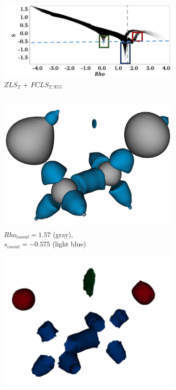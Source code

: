 \begin{figure}[t]
\begin{subfigure}{\linewidth}
\centering
\includegraphics[width=0.8\linewidth]{Images/EthaneDiol/scatterplot.pdf}
\caption{$ZLS_{T}$ + $FCLS_{T,95\%}$}
\label{}
\end{subfigure}
\begin{subfigure}{0.495\linewidth}
\centering
\includegraphics[width=\linewidth]{Images/EthaneDiol/gt.pdf}
\caption{$Rho_{isoval}=1.57$ (gray),\\ $s_{isoval}=-0.575$ (light blue)}
\label{}
\end{subfigure}
\begin{subfigure}{0.495\linewidth}
\centering
\includegraphics[width=\linewidth]{Images/EthaneDiol/zls.pdf}

\end{subfigure}
\end{figure}
